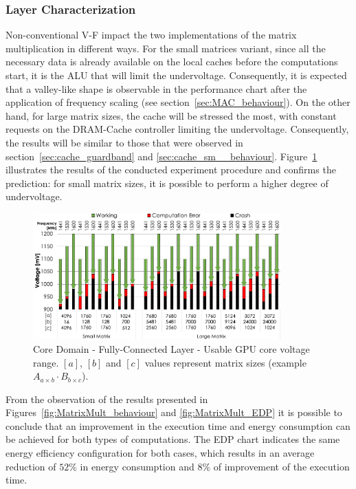 \subsubsection{Layer Characterization}

Non-conventional V-F impact the two implementations of the matrix multiplication in different ways. For the small matrices variant, 
since all the necessary data is already available on the local caches before the computations start, 
it is the ALU that will limit the undervoltage. Consequently, it is expected that a valley-like shape is observable in the performance chart after the application of frequency scaling (see section~\ref{sec:MAC_behaviour}). On the other hand, for large matrix sizes, the cache will be stressed the most, with constant requests on the DRAM-Cache controller limiting the undervoltage. Consequently, the results will be similar to those that were observed in section~\ref{sec:cache_guardband} and \ref{sec:cache_sm__behaviour}. Figure~\ref{fig:MatrixMult_guardband} illustrates the results of the conducted experiment procedure and confirms the prediction: for small matrix sizes, it is possible to perform a higher degree of undervoltage. 


\begin{figure}[htbp]
    \centering
        \includegraphics[width=0.85\textwidth]{Figures/Application To Deep Learning/MatrixMul_guardband.pdf}
        \caption{Core Domain - Fully-Connected Layer - Usable GPU core voltage range. $[a]$, $[b]$ and $[c]$ values represent matrix sizes (example $A_{a \times b} \cdot B_{b \times c}$).}
    \label{fig:MatrixMult_guardband}
\end{figure}


From the observation of the results presented in Figures~\ref{fig:MatrixMult_behaviour} and \ref{fig:MatrixMult_EDP} it is possible to conclude that an improvement in the execution time and energy consumption can be achieved for both types of computations. The EDP chart indicates the same energy efficiency configuration for both cases, which results in an average reduction of $52\%$ in energy consumption and $8\%$ of improvement of the execution time.


